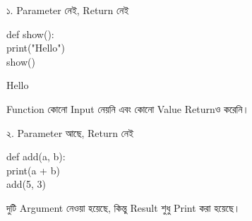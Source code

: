 
\begin{codeoutputbox}{১. Parameter নেই, Return নেই}

\noindent
\begin{minipage}[t]{0.53\linewidth}
\codeheading

\begin{english}
\ttfamily
def show():\\
\hspace*{4mm}print("Hello")\\[0.5mm]
show()
\end{english}

\end{minipage}
\hfill
\begin{minipage}[t]{0.43\linewidth}
\outputheading

\begin{center}
\textenglish{\ttfamily Hello}
\end{center}

Function কোনো Input নেয়নি এবং কোনো Value Returnও করেনি।

\end{minipage}

\end{codeoutputbox}

\begin{codeoutputbox}{২. Parameter আছে, Return নেই}

\noindent
\begin{minipage}[t]{0.53\linewidth}
\codeheading

\begin{english}
\ttfamily
def add(a, b):\\
\hspace*{4mm}print(a + b)\\[0.5mm]
add(5, 3)
\end{english}

\end{minipage}
\hfill
\begin{minipage}[t]{0.43\linewidth}
\outputheading

\begin{center}
\textenglish{}
\end{center}

দুটি Argument নেওয়া হয়েছে,
কিন্তু Result শুধু Print করা হয়েছে।

\end{minipage}

\end{codeoutputbox}

